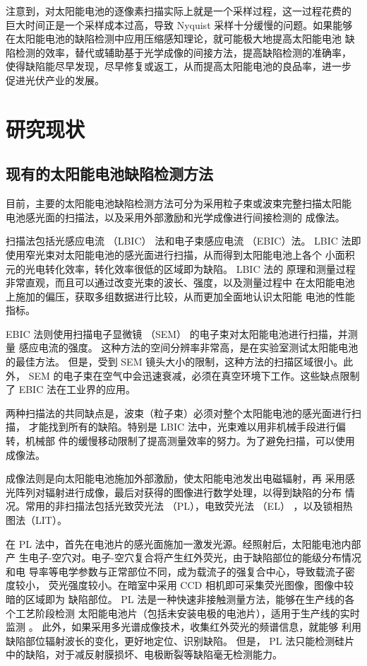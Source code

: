 注意到，对太阳能电池的逐像素扫描实际上就是一个采样过程，这一过程花费的
巨大时间正是一个采样成本过高，导致 Nyquist 采样十分缓慢的问题。如果能够
在太阳能电池的缺陷检测中应用压缩感知理论，就可能极大地提高太阳能电池
缺陷检测的效率，替代或辅助基于光学成像的间接方法，提高缺陷检测的准确率，
使得缺陷能尽早发现，尽早修复或返工，从而提高太阳能电池的良品率，进一步
促进光伏产业的发展。

\section{研究现状}

\subsection{现有的太阳能电池缺陷检测方法}

目前，主要的太阳能电池缺陷检测方法可分为采用粒子束或波束完整扫描太阳能
电池感光面的扫描法，以及采用外部激励和光学成像进行间接检测的
成像法。

扫描法包括光感应电流 （LBIC） 法和电子束感应电流 （EBIC）法。
LBIC 法即使用窄光束对太阳能电池的感光面进行扫描，从而得到太阳能电池上各个
小面积元的光电转化效率，转化效率很低的区域即为缺陷\cite{LBIC}。 LBIC 法的
原理和测量过程非常直观，而且可以通过改变光束的波长、强度，以及测量过程中
在太阳能电池上施加的偏压，获取多组数据进行比较，从而更加全面地认识太阳能
电池的性能指标\cite{LBICEnc}。

EBIC 法则使用扫描电子显微镜 （SEM） 的电子束对太阳能电池进行扫描，并测量
感应电流的强度\cite{EBIC}。
这种方法的空间分辨率非常高，是在实验室测试太阳能电池的最佳方法。
但是，受到 SEM 镜头大小的限制，这种方法的扫描区域很小。此外，
SEM 的电子束在空气中会迅速衰减，必须在真空环境下工作。这些缺点限制了 EBIC
法在工业界的应用。

两种扫描法的共同缺点是，波束（粒子束）必须对整个太阳能电池的感光面进行扫描，
才能找到所有的缺陷。特别是 LBIC 法中，光束难以用非机械手段进行偏转，机械部
件的缓慢移动限制了提高测量效率的努力。为了避免扫描，可以使用成像法。

成像法则是向太阳能电池施加外部激励，使太阳能电池发出电磁辐射，再
采用感光阵列对辐射进行成像，最后对获得的图像进行数学处理，以得到缺陷的分布
情况。常用的非扫描法包括光致荧光法 （PL），电致荧光法 （EL） ，以及锁相热
图法（LIT）。

在 PL 法中，首先在电池片的感光面施加一激发光源。经照射后，太阳能电池内部产
生电子-空穴对。电子-空穴复合将产生红外荧光，由于缺陷部位的能级分布情况和电
导率等电学参数与正常部位不同，成为载流子的强复合中心，导致载流子密度较小，
荧光强度较小。在暗室中采用 CCD 相机即可采集荧光图像，图像中较暗的区域即为
缺陷部位。 PL 法是一种快速非接触测量方法，能够在生产线的各个工艺阶段检测
太阳能电池片（包括未安装电极的电池片），适用于生产线的实时监测
\cite{FastPL}。 此外，如果采用多光谱成像技术，收集红外荧光的频谱信息，就能够
利用缺陷部位辐射波长的变化，更好地定位、识别缺陷\cite{SpectrePL}。 但是，
PL 法只能检测硅片中的缺陷，对于减反射膜损坏、电极断裂等缺陷毫无检测能力。


